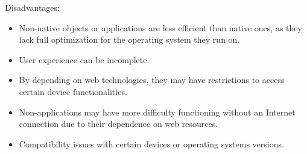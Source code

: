\documentclass[12pt,a4paper]{article}
\begin{document}
Disadvantages:
\begin{itemize}
\item Non-native objects or applications are less efficient than native ones, as they lack full optimization for the operating system they run on. 

\item User experience can be incomplete.

\item By depending on web technologies, they may have restrictions to access certain device functionalities.

\item Non-applications may have more difficulty functioning without an Internet connection due to their dependence on web resources.

\item Compatibility issues with certain devices or operating systems versions.
\end{itemize}



\end{document}
